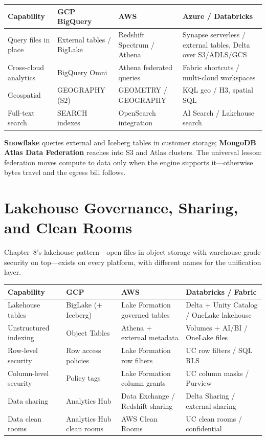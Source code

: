 \begin{center}
\footnotesize
\begin{tabular}{@{}p{2.8cm}p{3.0cm}p{3.0cm}p{3.4cm}@{}}
\toprule
\textbf{Capability} & \textbf{GCP BigQuery} & \textbf{AWS} & \textbf{Azure / Databricks} \\
\midrule
Query files in place & External tables / BigLake & Redshift Spectrum / Athena & Synapse serverless / external tables, Delta over S3/ADLS/GCS \\
Cross-cloud analytics & BigQuery Omni & Athena federated queries & Fabric shortcuts / multi-cloud workspaces \\
Geospatial & GEOGRAPHY (S2) & GEOMETRY / GEOGRAPHY & KQL geo / H3, spatial SQL \\
Full-text search & SEARCH indexes & OpenSearch integration & AI Search / Lakehouse search \\
\bottomrule
\end{tabular}
\end{center}

\noindent \textbf{Snowflake} queries external and Iceberg tables in customer storage;
\textbf{MongoDB Atlas Data Federation} reaches into S3 and Atlas clusters. The universal lesson:
federation moves compute to data only when the engine supports it---otherwise bytes travel and the
egress bill follows.

\section{Lakehouse Governance, Sharing, and Clean Rooms}
%
Chapter~8's lakehouse pattern---open files in object storage with warehouse-grade security on
top---exists on every platform, with different names for the unification layer.

\begin{center}
\footnotesize
\begin{tabular}{@{}p{2.8cm}p{3.0cm}p{3.0cm}p{3.4cm}@{}}
\toprule
\textbf{Capability} & \textbf{GCP} & \textbf{AWS} & \textbf{Databricks / Fabric} \\
\midrule
Lakehouse tables & BigLake (+ Iceberg) & Lake Formation governed tables & Delta + Unity Catalog / OneLake lakehouse \\
Unstructured indexing & Object Tables & Athena + external metadata & Volumes + AI/BI / OneLake files \\
Row-level security & Row access policies & Lake Formation row filters & UC row filters / SQL RLS \\
Column-level security & Policy tags & Lake Formation column grants & UC column masks / Purview \\
Data sharing & Analytics Hub & Data Exchange / Redshift sharing & Delta Sharing / external sharing \\
Data clean rooms & Analytics Hub clean rooms & AWS Clean Rooms & UC clean rooms / confidential \\
\bottomrule
\end{tabular}
\end{center}

